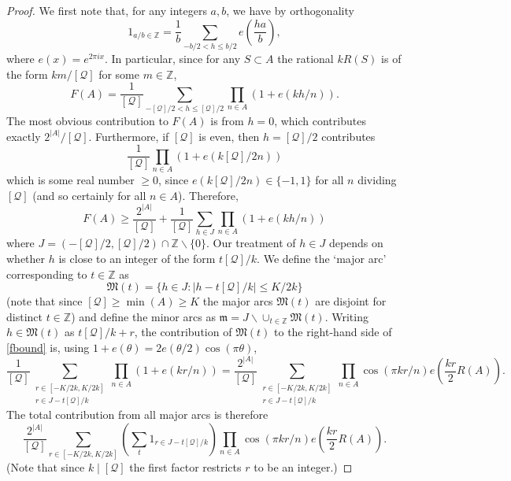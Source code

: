 \documentclass{amsart}
\newcommand{\bbz}{\mathbb{Z}}
\newcommand{\abs}[1]{\left\lvert #1\right\rvert}
\newcommand{\brac}[1]{\left( #1\right)}
\begin{document}
\begin{proof}
We first note that, for any integers $a,b$, we have by orthogonality
\[1_{a/b\in \bbz} = \frac{1}{b}\sum_{-b/2< h\leq b/2}e\brac{\frac{ha}{b}},\]
where $e(x)=e^{2\pi ix}$. In particular, since for any $S\subset A$ the rational $kR(S)$ is of the form $km/[\mathcal{Q}]$ for some $m\in \bbz$, 
\[F(A)= \frac{1}{[\mathcal{Q}]}\sum_{-[\mathcal{Q}]/2< h\leq [\mathcal{Q}]/2}\prod_{n\in A}(1+e(kh/n)).\]
The most obvious contribution to $F(A)$ is from $h=0$, which contributes exactly $2^{\abs{A}}/[\mathcal{Q}]$. Furthermore, if $[\mathcal{Q}]$ is even, then $h=[\mathcal{Q}]/2$ contributes
\[\frac{1}{[\mathcal{Q}]}\prod_{n\in A}(1+e(k[\mathcal{Q}]/2n))\]
which is some real number $\geq 0$, since $e(k[\mathcal{Q}]/2n)\in \{-1,1\}$ for all $n$ dividing $[\mathcal{Q}]$ (and so certainly for all $n\in A$). Therefore,
\begin{equation}\label{fbound}
F(A)\geq \frac{2^{\abs{A}}}{[\mathcal{Q}]}+\frac{1}{[\mathcal{Q}]}\sum_{h\in J}\prod_{n\in A}(1+e(kh/n))
\end{equation}
where $J= (-[\mathcal{Q}]/2,[\mathcal{Q}]/2)\cap \bbz\backslash \{0\}$. Our treatment of $h\in J$ depends on whether $h$ is close to an integer of the form $t[\mathcal{Q}]/k$. We define the `major arc' corresponding to $t\in\bbz$ as
\[\mathfrak{M}(t) = \{ h\in J : \abs{h-t[\mathcal{Q}]/k}\leq K/2k\}\]
(note that since $[\mathcal{Q}] \geq \min(A)\geq K$ the major arcs $\mathfrak{M}(t)$ are disjoint for distinct $t\in\bbz$) and define the minor arcs as $\mathfrak{m} = J\backslash \cup_{t\in \bbz}\mathfrak{M}(t)$. Writing $h\in\mathfrak{M}(t)$ as $t[\mathcal{Q}]/k+r$, the contribution of $\mathfrak{M}(t)$ to the right-hand side of \eqref{fbound} is, using  $1+e(\theta)=2e(\theta/2)\cos(\pi \theta)$,
\[ \frac{1}{[\mathcal{Q}]}\sum_{\substack{r\in  [-K/2k,K/2k]\\ r\in J-t[\mathcal{Q}]/k} }\prod_{n\in A}(1+e(kr/n))=\frac{2^{\abs{A}}}{[\mathcal{Q}]}\sum_{\substack{r\in  [-K/2k,K/2k]\\ r\in J-t[\mathcal{Q}]/k} }\prod_{n\in A}\cos(\pi kr/n)e\brac{ \frac{kr}{2}R(A)}.\]
The total contribution from all major arcs is therefore
\[\frac{2^{\abs{A}}}{[\mathcal{Q}]}\sum_{r\in [-K/2k,K/2k]}\brac{\sum_{t}1_{r\in J-t[\mathcal{Q}]/k}}\prod_{n\in A}\cos(\pi kr/n)e\brac{ \frac{kr}{2}R(A)}.\]
(Note that since $k\mid [\mathcal{Q}]$ the first factor restricts $r$ to be an integer.) 


\end{proof}
\end{document}
